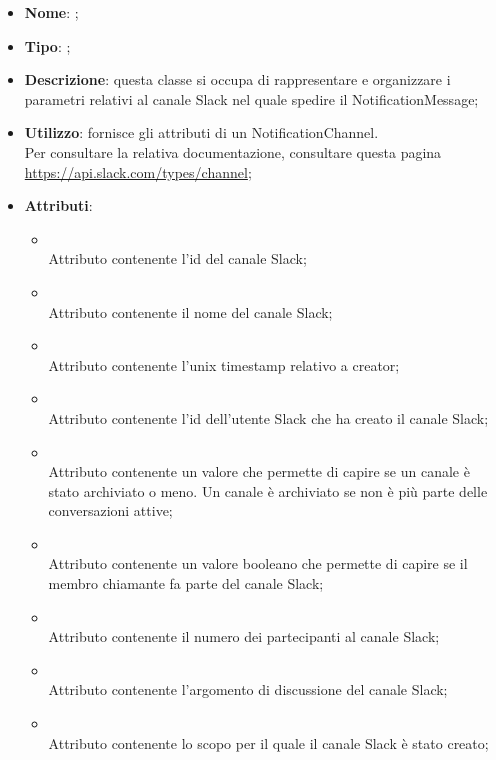 \begin{itemize}
	\item \textbf{Nome}: ;
	\item \textbf{Tipo}: ;
	\item \textbf{Descrizione}: questa classe si occupa di rappresentare e organizzare i parametri relativi al canale Slack nel quale spedire il NotificationMessage;
	\item \textbf{Utilizzo}: fornisce gli attributi di un NotificationChannel. \\
Per consultare la relativa documentazione, consultare questa pagina \url{https://api.slack.com/types/channel};
	\item \textbf{Attributi}:
	\begin{itemize}
		\item[]  \\
		Attributo contenente l'id del canale Slack;
		\item[]  \\
		Attributo contenente il nome del canale Slack;
		\item[]  \\
		Attributo contenente l'unix timestamp relativo a creator;
		\item[]  \\
		Attributo contenente l'id dell'utente Slack  che ha creato il canale Slack;
		\item[]  \\
		Attributo contenente un valore che permette di capire se un canale è stato archiviato o meno.
Un canale è archiviato se non è più parte delle conversazioni attive;
		\item[]  \\
		Attributo contenente un valore booleano che permette di capire se il membro chiamante fa parte del canale Slack;
		\item[]  \\
		Attributo contenente il numero dei partecipanti al canale Slack;
		\item[]  \\
		Attributo contenente l'argomento di discussione del canale Slack;
		\item[]  \\
		Attributo contenente lo scopo per il quale il canale Slack è stato creato;
	\end{itemize}
\end{itemize}
\FloatBarrier


